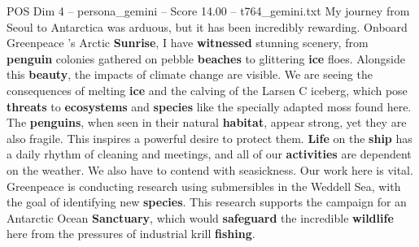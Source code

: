 \begin{textsample}{POS Dim 4 – persona\_gemini – Score 14.00 – t764\_gemini.txt}  \label{ex:f4_pos_048}
My journey from Seoul to Antarctica was arduous, but it has been incredibly rewarding.
Onboard Greenpeace ’s Arctic \textbf{Sunrise}, I have \textbf{witnessed} stunning scenery, from \textbf{penguin} colonies gathered on pebble \textbf{beaches} to glittering \textbf{ice} floes.
Alongside this \textbf{beauty}, the impacts of climate change are visible.
We are seeing the consequences of melting \textbf{ice} and the calving of the Larsen C iceberg, which pose \textbf{threats} to \textbf{ecosystems} and \textbf{species} like the specially adapted moss found here.
The \textbf{penguins}, when seen in their natural \textbf{habitat}, appear strong, yet they are also fragile.
This inspires a powerful desire to protect them. \textbf{Life} on the \textbf{ship} has a daily rhythm of cleaning and meetings, and all of our \textbf{activities} are dependent on the weather.
We also have to contend with seasickness.
Our work here is vital.
Greenpeace is conducting research using submersibles in the Weddell Sea, with the goal of identifying new \textbf{species}.
This research supports the campaign for an Antarctic Ocean \textbf{Sanctuary}, which would \textbf{safeguard} the incredible \textbf{wildlife} here from the pressures of industrial krill \textbf{fishing}.

\end{textsample}

